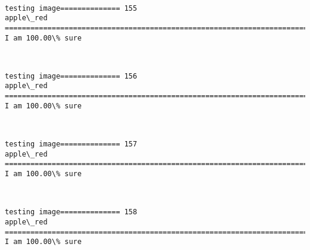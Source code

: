 \documentclass[11pt]{article}
\begin{document}
    \begin{center}
    \end{center}
    { \hspace*{\fill} \\}
    
    \begin{Verbatim}[commandchars=\\\{\}]
testing image============== 155
apple\_red
============================================================================
I am 100.00\% sure

    \end{Verbatim}

    \begin{center}
    \end{center}
    { \hspace*{\fill} \\}
    
    \begin{Verbatim}[commandchars=\\\{\}]
testing image============== 156
apple\_red
============================================================================
I am 100.00\% sure

    \end{Verbatim}

    \begin{center}
    \end{center}
    { \hspace*{\fill} \\}
    
    \begin{Verbatim}[commandchars=\\\{\}]
testing image============== 157
apple\_red
============================================================================
I am 100.00\% sure

    \end{Verbatim}

    \begin{center}
    \end{center}
    { \hspace*{\fill} \\}
    
    \begin{Verbatim}[commandchars=\\\{\}]
testing image============== 158
apple\_red
============================================================================
I am 100.00\% sure

    \end{Verbatim}
\end{document}
